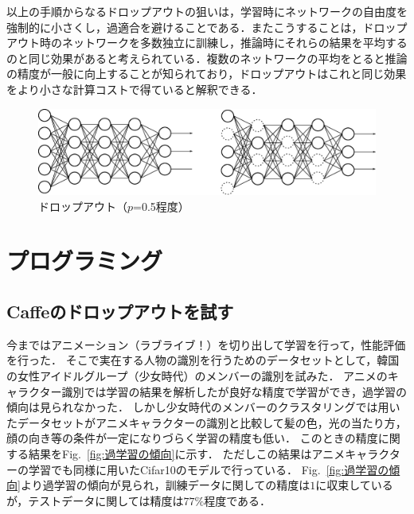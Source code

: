 \documentclass[a4paper,10pt]{jsarticle}
\begin{document}
以上の手順からなるドロップアウトの狙いは，学習時にネットワークの自由度を強制的に小さくし，過適合を避けることである．またこうすることは，ドロップアウト時のネットワークを多数独立に訓練し，推論時にそれらの結果を平均するのと同じ効果があると考えられている．複数のネットワークの平均をとると推論の精度が一般に向上することが知られており，ドロップアウトはこれと同じ効果をより小さな計算コストで得ていると解釈できる．

\begin{figure}[tb]
  \begin{center}
    \includegraphics[clip,width=12cm]{./fig/eps/dropout1.eps}
  \end{center}
  \caption{ドロップアウト（$p$=0.5程度）}
  \label{fig: ドロップアウト（p=0.5程度）}
\end{figure}


\section{プログラミング}
\subsection{Caffeのドロップアウトを試す}
今まではアニメーション（ラブライブ！）を切り出して学習を行って，性能評価を行った．
そこで実在する人物の識別を行うためのデータセットとして，韓国の女性アイドルグループ（少女時代）のメンバーの識別を試みた．
アニメのキャラクター識別では学習の結果を解析したが良好な精度で学習ができ，過学習の傾向は見られなかった．
しかし少女時代のメンバーのクラスタリングでは用いたデータセットがアニメキャラクターの識別と比較して髪の色，光の当たり方，顔の向き等の条件が一定になりづらく学習の精度も低い．
このときの精度に関する結果をFig.~\ref{fig:過学習の傾向}に示す．
ただしこの結果はアニメキャラクターの学習でも同様に用いたCifar10のモデルで行っている．
Fig.~\ref{fig:過学習の傾向}より過学習の傾向が見られ，訓練データに関しての精度は$1$に収束しているが，テストデータに関しては精度は$77\%$程度である．
\end{document}
